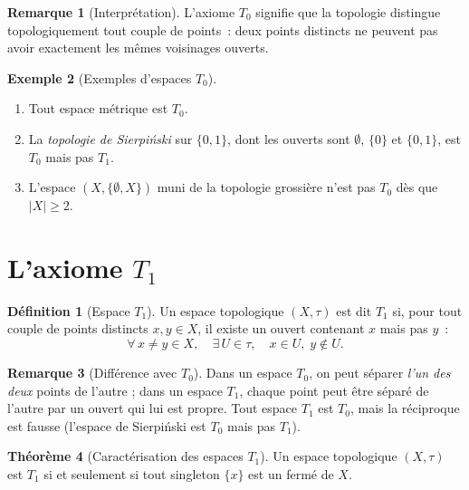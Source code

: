 \documentclass[12pt,a4paper,openany]{book}
\theoremstyle{definition}
\newtheorem{definition}{Définition}[chapter]
\theoremstyle{cours}
\newtheorem{theoreme}{Théorème}[chapter]
\theoremstyle{coursnormal}
\newtheorem{remarque}[theoreme]{Remarque}
\newtheorem{exemple}[theoreme]{Exemple}
\begin{document}
\begin{remarque}[Interprétation]\label{rem:rem:T0-interpretation}
  L'axiome $T_0$ signifie que la topologie distingue topologiquement tout
  couple de points~: deux points distincts ne peuvent pas avoir exactement les
  mêmes voisinages ouverts.
\end{remarque}

\begin{exemple}[Exemples d'espaces $T_0$]\label{ex:T0}
  \begin{enumerate}
    \item Tout espace métrique est $T_0$.
    \item La \emph{topologie de Sierpi\'nski}
      sur $\{0,1\}$, dont les ouverts sont $\emptyset$, $\{0\}$ et $\{0,1\}$,
      est $T_0$ mais pas $T_1$.
    \item L'espace $(X,\{\emptyset, X\})$ muni de la topologie grossière n'est
      pas $T_0$ dès que $|X|\geq 2$.
  \end{enumerate}
\end{exemple}

\section{L'axiome $T_1$}\label{sec:T1}

\begin{definition}[Espace $T_1$]\label{def:T1}
  Un espace topologique $(X,\tau)$ est dit
  \emph{$T_1$} si, pour tout couple de points distincts $x,y\in X$, il existe
  un ouvert contenant $x$ mais pas $y$~:
  \[
    \forall\, x\neq y\in X,\quad
    \exists\, U\in\tau,\quad x\in U,\; y\notin U.
  \]
\end{definition}

\begin{remarque}[Différence avec $T_0$]\label{rem:rem:T1-vs-T0}
  Dans un espace $T_0$, on peut séparer \emph{l'un des deux} points de
  l'autre ; dans un espace $T_1$, chaque point peut être séparé de l'autre par
  un ouvert qui lui est propre. Tout espace $T_1$ est $T_0$, mais la réciproque
  est fausse (l'espace de Sierpi\'nski est $T_0$ mais pas $T_1$).
\end{remarque}

\begin{theoreme}[Caractérisation des espaces $T_1$]\label{thm:T1-singletons}
  Un espace topologique $(X,\tau)$ est $T_1$ si et seulement si tout singleton
  $\{x\}$ est un fermé de $X$.
\end{theoreme}
\end{document}
